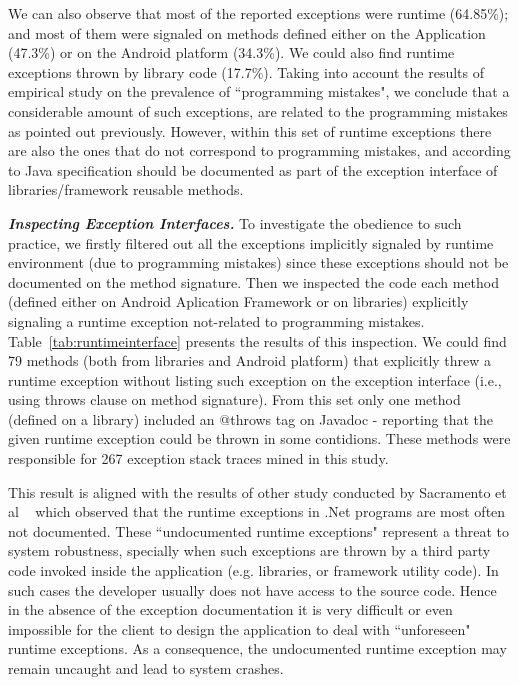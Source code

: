 \documentclass[conference]{IEEEtran}
\begin{document}
We can also observe that most of the reported exceptions were runtime 
(64.85\%); and most of them were signaled on methods defined either on the Application (47.3\%)
or on the Android platform (34.3\%). We could also find runtime exceptions thrown by library code (17.7\%).
 Taking into account the results of empirical study on the prevalence of ``programming mistakes", 
we conclude that a considerable amount 
of such exceptions, are related to the programming mistakes
as pointed out previously. However, within this set of runtime exceptions there are also the ones that do not correspond to programming mistakes,
and according to Java specification should be documented as part of the exception interface of libraries/framework reusable
methods.

\emph{\textbf{Inspecting Exception Interfaces.}} To investigate the obedience to such practice, we firstly filtered out all the exceptions implicitly
 signaled by  runtime environment (due to programming mistakes) since these exceptions 
should not be documented on the method signature.  Then we inspected the code each method 
(defined either on Android  Aplication Framework or on libraries) 
explicitly signaling a runtime exception not-related to programming mistakes.
Table~\ref{tab:runtimeinterface} presents the results of this inspection. 
We could find 79 methods (both from libraries and Android platform) that  explicitly threw a runtime exception 
without listing such exception on the exception interface (i.e., using 
throws clause on method signature). From this set only one method (defined on a library)
included an @throws tag on Javadoc - reporting that the given runtime exception
could be thrown in some contidions. These methods were responsible for 
267 exception stack traces mined in this study.

This result is aligned with the results of other study conducted by  
Sacramento et al ~\cite{sacramento2006unchecked} which observed that the
runtime exceptions in .Net programs are most often not documented.
These ``undocumented runtime exceptions" represent a threat to system robustness, specially
when such exceptions are thrown by a third party code invoked inside the application 
(e.g. libraries, or framework utility code). In such cases the developer usually does not have access to 
the source code. Hence in the absence of the exception documentation it is very difficult or even impossible
 for the client to design the application to deal with ``unforeseen" runtime exceptions. As a consequence, the
 undocumented runtime exception may remain uncaught and lead to system crashes.
\end{document}

